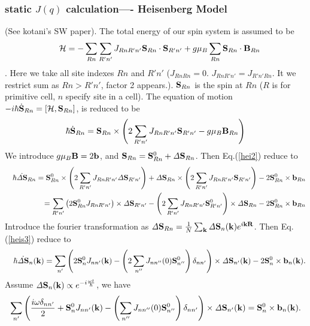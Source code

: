 \documentclass[a4paper,10pt,epsf,fleqn]{article}
\newcommand{\bfk}{{\bf k}}
\newcommand{\bfR}{{\bf R}}
\newcommand{\ds}{\displaystyle}
\newcommand{\bfb}{{\bf b}}
\newcommand{\bfS}{{\bf S}}
\newcommand{\bfiS}{{\it \Delta \bf S}}
\newcommand{\bfB}{{\bf B}}
\newcommand{\req}[1]{Eq.(\ref{#1})}
\begin{document}
\subsubsection{static $J(q)$ calculation---- Heisenberg Model}
(See kotani's SW paper).
The total energy of our spin system is assumed to be
\begin{eqnarray}
&& {\cal H} = - \sum_{Rn} \sum_{R'n'} 
J_{Rn R'n'} \bfS_{Rn} \cdot \bfS_{R'n'} + g \mu_B \sum_{Rn} 
\bfS_{Rn} \cdot \bfB_{Rn}
\label{hei1}
\end{eqnarray}
. Here we take all site indexes $Rn$ and $R'n'$ 
($J_{RnRn}=0$. $J_{RnR'n'}=J_{R'n'Rn}$. 
It we restrict sum as $Rn>R'n'$, factor 2 appears.).
$\bfS_{Rn}$ is the spin at $Rn$ ($R$ is for primitive cell, $n$ specify
site in a cell).
The equation of motion 
$-i\hbar \dot{\bfS}_{Rn} = [{\cal H} , {\bfS}_{Rn}]$,
is reduced to be
\begin{eqnarray}
\hbar \dot{\bfS}_{Rn} = \bfS_{Rn} \times 
\left(2 \sum_{R'n'} J_{Rn R'n'} \bfS_{R'n'} - g \mu_B \bfB_{Rn} \right)
\label{hei2}
\end{eqnarray}
We introduce $g \mu_B \bfB = 2 \bfb$, and $\bfS_{Rn}=\bfS_{Rn}^0 + 
\bfiS_{Rn}$. Then \req{hei2} reduce to
\begin{eqnarray}
&&\hbar \dot{\bfiS}_{Rn} =  \bfS^0_{Rn} \times
\left(2 \sum_{R'n'} J_{Rn R'n'} \bfiS_{R'n'}  \right)
+ \bfiS_{Rn} \times 
\left(2 \sum_{R'n'} J_{Rn R'n'} \bfS_{R'n'} \right)
- 2 \bfS^0_{Rn} \times \bfb_{Rn} \nonumber \\
&&= \sum_{R'n'} \left(2 \bfS^0_{Rn} J_{Rn R'n'} \right) \times \bfiS_{R'n'}
- 
\left(2 \sum_{R'n'} J_{Rn R'n'} \bfS^0_{R'n'} \right)  \times \bfiS_{Rn} 
- 2 \bfS^0_{Rn} \times \bfb_{Rn} 
\label{hei3}
\end{eqnarray}
Introduce the fourier transformation as
$\bfiS_{Rn} = \frac{1}{N} \sum_\bfk \bfiS_n(\bfk) e^{i \bfk \bfR}$.
Then \req{heis3} reduce to
\begin{eqnarray}
&&\hbar \dot{\bfiS}_{n}(\bfk)   
= \sum_{n'} \left( 2 \bfS^0_{n} J_{n n'}(\bfk) 
- \left(2 \sum_{n''} J_{n n''}(0) \bfS_{n''}^0\right) \delta_{nn'}\right)  \times \bfiS_{n'}(\bfk)
- 2 \bfS^0_{n} \times \bfb_{n}(\bfk).
\label{hei4}
\end{eqnarray}
Assume $\ds {\bfiS}_{n}(\bfk) \propto e^{-i \frac{\omega t}{\hbar}}$,
we have 
\begin{eqnarray}
 \sum_{n'} \left(\frac{i \omega \delta_{nn'}}{2} +  \bfS^0_{n} J_{n n'}(\bfk) 
- \left( \sum_{n''} J_{n n''}(0) \bfS_{n''}^0\right) \delta_{nn'}\right)  \times \bfiS_{n'}(\bfk)
= \bfS^0_{n} \times \bfb_{n}(\bfk).
\label{hei5}
\end{eqnarray}
\end{document}
